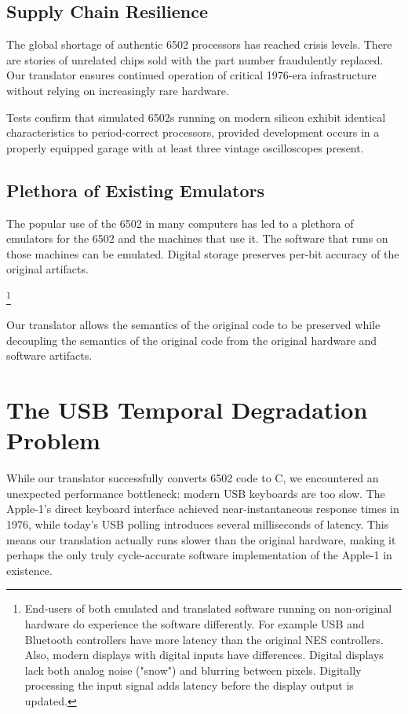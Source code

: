 \documentclass[10pt,twocolumn]{article}
\begin{document}
\subsection{Supply Chain Resilience}
The global shortage of authentic 6502 processors has reached crisis levels.  There are stories of unrelated chips sold with the part number fraudulently replaced.  Our translator ensures continued operation of critical 1976-era infrastructure without relying on increasingly rare hardware.

Tests confirm that simulated 6502s running on modern silicon exhibit identical characteristics to period-correct processors, provided development occurs in a properly equipped garage with at least three vintage oscilloscopes present.

\subsection{Plethora of Existing Emulators}
The popular use of the 6502 in many computers has led to a plethora of emulators for the 6502 and the machines that use it.  The software that runs on those machines can be emulated.  Digital storage preserves per-bit accuracy of the original artifacts.

\footnote{End-users of both emulated and translated software running on non-original hardware do experience the software differently.  For example USB and Bluetooth controllers have more latency than the original NES controllers.  Also, modern displays with digital inputs have differences.  Digital displays lack both analog noise ("snow") and blurring between pixels.  Digitally processing the input signal adds latency before the display output is updated.}

Our translator allows the semantics of the original code to be preserved while decoupling the semantics of the original code from the original hardware and software artifacts.

\section{The USB Temporal Degradation Problem}
While our translator successfully converts 6502 code to C, we encountered an unexpected performance bottleneck: modern USB keyboards are too slow. The Apple-1's direct keyboard interface achieved near-instantaneous response times in 1976, while today's USB polling introduces several milliseconds of latency. This means our translation actually runs slower than the original hardware, making it perhaps the only truly cycle-accurate software implementation of the Apple-1 in existence.
\end{document}
